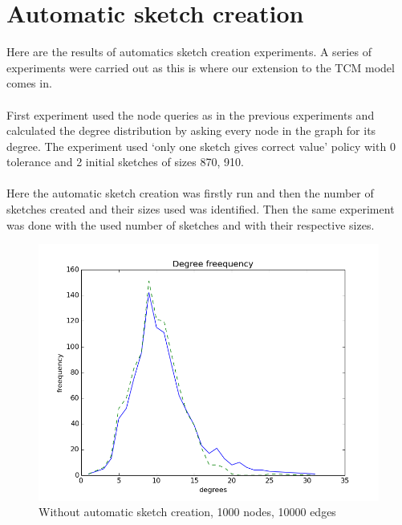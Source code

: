 \documentclass[12pt]{report}
\numberwithin{figure}{section}
\numberwithin{table}{section}
\begin{document}
\section{Automatic sketch creation}
Here are the results of automatics sketch creation experiments. A series of experiments were carried out as this is where our extension to the TCM model comes in. 

\paragraph{}

First experiment used the node queries as in the previous experiments and calculated the degree distribution by asking every node in the graph for its degree. The experiment used ‘only one sketch gives correct value’ policy with 0 tolerance and 2 initial sketches of sizes 870, 910.

\paragraph{}

Here the automatic sketch creation was firstly run and then the number of sketches created and their sizes used was identified. Then the same experiment was done with the used number of sketches and with their respective sizes. 

\begin{figure}[H]
\centering
\includegraphics[scale=0.6]{images/ddas1}
\caption{Without automatic sketch creation, 1000 nodes, 10000 edges}
\end{figure}
\end{document}
